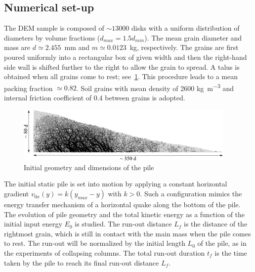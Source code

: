 \subsection{Numerical set-up}
\label{sec:num}

The DEM sample 
is composed of $\sim13000$ disks with a uniform distribution of diameters by 
volume fractions ($d_{max} = 1.5 d_{min}$). The mean grain diameter and mass 
are $d\simeq 2.455 $~\si{\mm} and $m\simeq 0.0123$~\si{\kg}, respectively. The 
grains are first poured uniformly into a rectangular box of given width and 
then the right-hand side wall is shifted further to the right to allow the 
grain to spread. A talus is obtained when all grains come to rest; 
see~\cref{fig:slope_configuration}. This procedure leads to a mean packing 
fraction $\simeq 0.82$. Soil grains with mean density of 2600 
\si{\kg\per\m\cubed} and internal friction coefficient of 0.4 between grains 
is adopted.

\begin{figure}[tbph]
\includegraphics[width=0.95\textwidth]{slope_configuration}
\caption{Initial geometry and dimensions of the pile}
\label{fig:slope_configuration}
\end{figure}


The initial static pile is set into motion by applying a constant horizontal
gradient  $v_{0x}(y) = k (y_{max} - y)$ with $k>0$. Such a configuration 
mimics the energy transfer mechanism of a horizontal quake along the bottom of 
the pile. The evolution of pile geometry and the total kinetic energy as a 
function of the initial input energy $E_0$ is studied. The run-out distance 
$L_f$ is the distance of the rightmost grain, which is still in contact with 
the main mass when the pile comes to rest.  The run-out will be normalized by 
the initial length $L_0$ of the pile, as in the experiments of collapsing 
columns. The total run-out duration $t_f$ is the time taken by the pile to 
reach its final run-out distance $L_f$.

